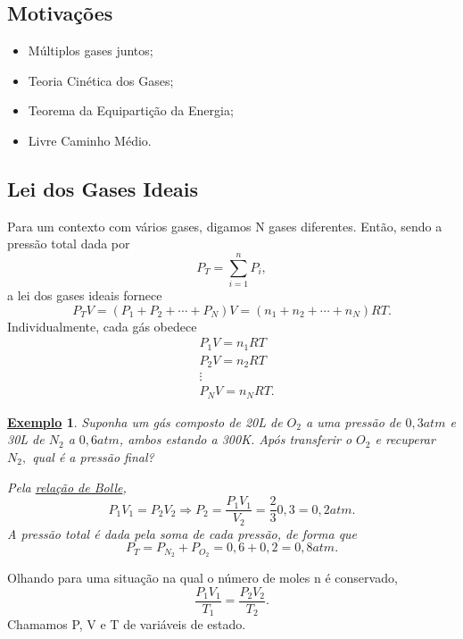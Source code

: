 \documentclass{article}
\newtheorem{example}{\underline{Exemplo}}
\begin{document}
\subsection{Motivações} 
\begin{itemize}
  \item Múltiplos gases juntos;
  \item Teoria Cinética dos Gases;
  \item Teorema da Equipartição da Energia;
  \item Livre Caminho Médio.
\end{itemize}
\subsection{Lei dos Gases Ideais}
Para um contexto com vários gases, digamos N gases diferentes. Então, sendo a pressão total dada por 
\[
  P_{T} = \sum\limits_{i=1}^{n}P_{i},
\]
a lei dos gases ideais fornece 
\[
  P_{T}V = (P_{1} + P_{2} + \cdots + P_{N})V = (n_{1} + n_{2} + \cdots + n_{N})RT.
\]
Individualmente, cada gás obedece
\begin{align*}
   &P_{1}V = n_{1}RT\\
   &P_{2}V = n_{2}RT\\
   &\vdots\\
   &P_{N}V = n_{N}RT.
\end{align*}
\begin{example}
  Suponha um gás composto de 20L de \(O_{2}\) a uma pressão de \(0,3atm\) e 30L de \(N_{2}\) a \(0,6atm\), ambos estando
  a 300K. Após transferir o \(O_{2}\) e recuperar \(N_{2},\) qual é a pressão final?

  Pela \hyperlink{boyle}{relação de Bolle}, 
  \[
    P_{1}V_{1} = P_{2}V_{2} \Rightarrow P_{2} = \frac{P_{1}V_{1}}{V_{2}} = \frac{2}{3}0,3 = 0,2atm.
  \]
  A pressão total é dada pela soma de cada pressão, de forma que 
  \[
    P_{T} = P_{N_{2}} + P_{O_{2}} = 0,6 + 0,2 = 0,8atm.
  \]
\end{example}

Olhando para uma situação na qual o número de moles n é conservado, 
\[
  \frac{P_{1}V_{1}}{T_{1}} = \frac{P_{2}V_{2}}{T_{2}}.
\]
Chamamos P, V e T de variáveis de estado.
\end{document}
